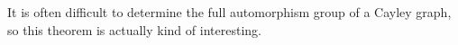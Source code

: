 It is often difficult to determine the full automorphism group of a Cayley graph, so this theorem is actually kind of interesting.














\ifdraft


\fi